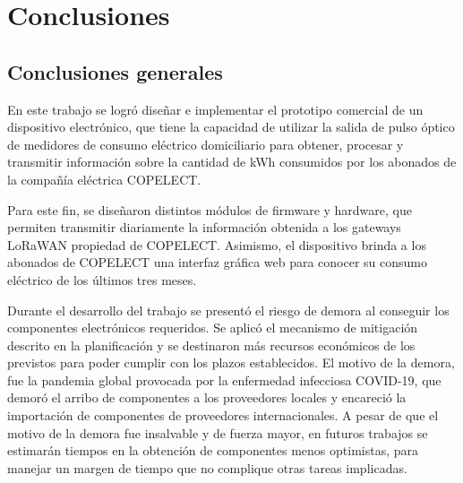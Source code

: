 
\chapter{Conclusiones} %

\label{Chapter5} %




\section{Conclusiones generales }

En este trabajo se logró diseñar e implementar el prototipo comercial de un dispositivo electrónico, que tiene la capacidad de utilizar la salida de pulso óptico de medidores de consumo eléctrico domiciliario para obtener, procesar y transmitir información sobre la cantidad de kWh consumidos por los abonados de la compañía eléctrica COPELECT.

Para este fin, se diseñaron distintos módulos de firmware y hardware, que permiten transmitir diariamente la información obtenida a los gateways LoRaWAN propiedad de COPELECT. Asimismo, el dispositivo brinda a los abonados de COPELECT una interfaz gráfica web para conocer su consumo eléctrico de los últimos tres meses.

Durante el desarrollo del trabajo se presentó el riesgo de demora al conseguir los componentes electrónicos requeridos. Se aplicó el mecanismo de mitigación descrito en la planificación y se destinaron más recursos económicos de los previstos para poder cumplir con los plazos establecidos. El motivo de la demora, fue la pandemia global provocada por la enfermedad infecciosa COVID-19, que demoró el arribo de componentes a los proveedores locales y encareció la importación de componentes de proveedores internacionales. A pesar de que el motivo de la demora fue insalvable y de fuerza mayor, en futuros trabajos se estimarán tiempos en la obtención de componentes menos optimistas, para manejar un margen de tiempo que no complique otras tareas implicadas.

